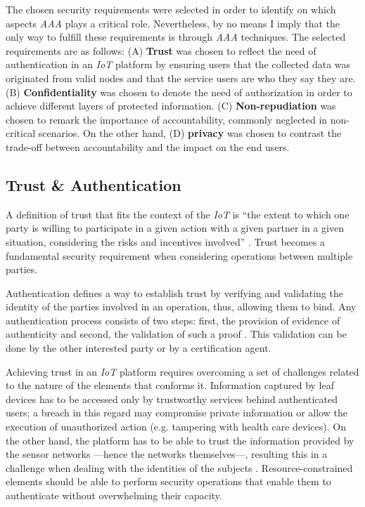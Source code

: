 \documentclass[journal]{IEEEtran}
\begin{document}
  The chosen security requirements were selected in order to identify on which aspects \emph{AAA} plays a critical role. Nevertheless, by no means I imply that the only way to fulfill these requirements is through \emph{AAA} techniques. The selected requirements are as follows: (A) \textbf{Trust} was chosen to reflect the need of authentication in an \emph{IoT} platform by ensuring users that the collected data was originated from valid nodes and that the service users are who they say they are. (B) \textbf{Confidentiality} was chosen to denote the need of authorization in order to achieve different layers of protected information. (C) \textbf{Non-repudiation} was chosen to remark the importance of accountability, commonly neglected in non-critical scenarios. On the other hand, (D) \textbf{privacy} was chosen to contrast the trade-off between accountability and the impact on the end users.

  \subsection{Trust \& Authentication}
  A definition of trust that fits the context of the \emph{IoT} is ``the extent to which one party is willing to participate in a given action with a given partner in a given situation, considering the risks and incentives involved'' \cite{Ruohomaa2006}. Trust becomes a fundamental security requirement when considering operations between multiple parties.

  Authentication defines a way to establish trust by verifying and validating the identity of the parties involved in an operation, thus, allowing them to bind. Any authentication process consists of two steps: first, the provision of evidence of authenticity and second, the validation of such a proof \cite{Sklavos2007}. This validation can be done by the other interested party or by a certification agent.

  Achieving trust in an \emph{IoT} platform requires overcoming a set of challenges related to the nature of the elements that conforms it. Information captured by leaf devices has to be accessed only by trustworthy services behind authenticated users; a breach in this regard may compromise private information or allow the execution of unauthorized action (e.g. tampering with health care devices). On the other hand, the platform has to be able to trust the information provided by the sensor networks ---hence the networks themselves---, resulting this in a challenge when dealing with the identities of the subjects \cite{Kanuparthi2013}. Resource-constrained elements should be able to perform security operations that enable them to authenticate without overwhelming their capacity. 
\end{document}
